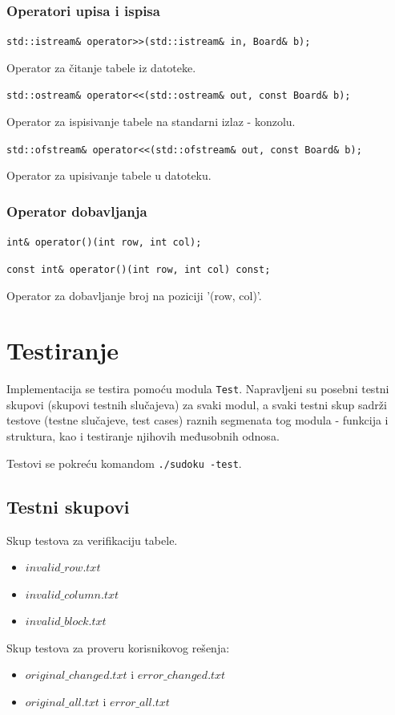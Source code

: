 \documentclass[a4paper]{article}
\begin{document}
    \subsubsection{Operatori upisa i ispisa}
    \par\texttt{std::istream\& operator>>(std::istream\& in, Board\& b);}
    \par Operator za čitanje tabele iz datoteke.
    \par\texttt{std::ostream\& operator<<(std::ostream\& out, const Board\& b);}
    \par Operator za ispisivanje tabele na standarni izlaz - konzolu.
    \par\texttt{std::ofstream\& operator<<(std::ofstream\& out, const Board\& b);}
    \par Operator za upisivanje tabele u datoteku. 

    \subsubsection{Operator dobavljanja}
    \par\texttt{int\& operator()(int row, int col);}
    \par\texttt{const int\& operator()(int row, int col) const;}
    \par Operator za dobavljanje broj na poziciji '(row, col)'.
    
    \newpage
    \section{Testiranje}
    Implementacija se testira pomoću modula \texttt{Test}. Napravljeni su posebni testni skupovi (skupovi testnih slučajeva) za svaki modul, 
    a svaki testni skup sadrži testove (testne slučajeve, test cases) raznih segmenata tog modula - funkcija i struktura, kao i testiranje njihovih međusobnih odnosa.
    \par Testovi se pokreću komandom \texttt{./sudoku -test}.
    \subsection{Testni skupovi}
    {\parindent0pt
        Skup testova za verifikaciju tabele.
        \begin{itemize}
            \item $invalid\_row.txt$
            \item $invalid\_column.txt$
            \item $invalid\_block.txt$
        \end{itemize}
        \par Skup testova za proveru korisnikovog rešenja:
        \begin{itemize}
            \item $original\_changed.txt$ i $error\_changed.txt$
            \item $original\_all.txt$ i $error\_all.txt$
        \end{itemize}    
    }
\end{document}
